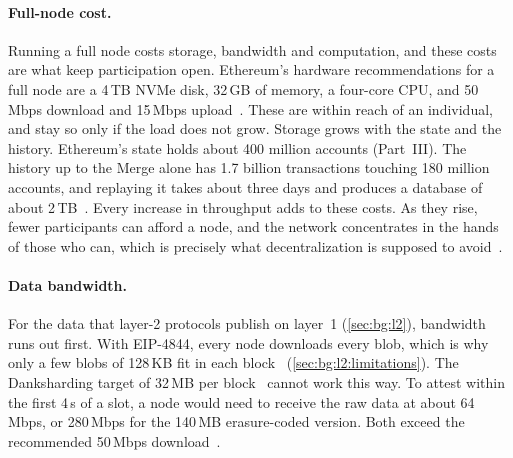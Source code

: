\paragraph{Full-node cost.}
Running a full node costs storage, bandwidth and computation, and these costs are what keep participation open.
Ethereum's hardware recommendations for a full node are a 4\,TB NVMe disk, 32\,GB of memory, a four-core CPU, and 50\,Mbps download and 15\,Mbps upload~\cite{eip7870}.
These are within reach of an individual, and stay so only if the load does not grow.
Storage grows with the state and the history.
Ethereum's state holds about 400 million accounts (Part~III). 
The history up to the Merge alone has 1.7 billion transactions touching 180 million accounts, and replaying it takes about three days and produces a database of about 2\,TB~\cite{pigaglio2023exploring}. 
Every increase in throughput adds to these costs.
As they rise, fewer participants can afford a node, and the network concentrates in the hands of those who can, which is precisely what decentralization is supposed to avoid~\cite{gervais2016security,croman2016scaling}.

\paragraph{Data bandwidth.}
For the data that layer-2 protocols publish on layer~1 (\autoref{sec:bg:l2}), bandwidth runs out first.
With EIP-4844, every node downloads every blob, which is why only a few blobs of 128\,KB fit in each block~\cite{eip4844} (\autoref{sec:bg:l2:limitations}).
The Danksharding target of 32\,MB per block~\cite{ethdanksharding} cannot work this way.
To attest within the first 4\,s of a slot, a node would need to receive the raw data at about 64\,Mbps, or 280\,Mbps for the 140\,MB erasure-coded version.
Both exceed the recommended 50\,Mbps download~\cite{eip7870}. 

